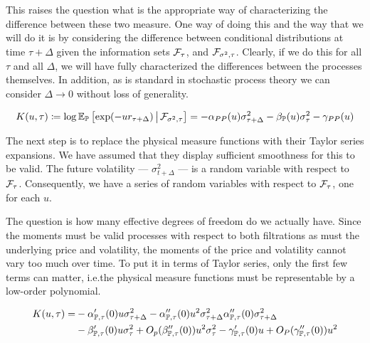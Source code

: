 \documentclass[11pt, letterpaper, twoside, final]{article}
\begin{document}
This raises the question what is the appropriate way of characterizing the difference between these two measure.
One way of doing this and the way that we will do it is by considering the difference between conditional
distributions at time $\tau + \Delta$ given the information sets $\mathcal{F}_{\tau}$, and $\mathcal{F}_{\sigma^2, \tau}$.
Clearly, if we do this for all $\tau$ and all $\Delta$, we will have fully characterized the differences between
the processes themselves.
In addition, as is standard in stochastic process theory we can consider $\Delta \to 0$ without loss of
generality.



\begin{equation}
    K(u, \tau) \coloneqq \log \operatorname{\mathbb{E}}_{\mathbb{P}}\left[\exp(-u r_{\tau + \Delta}) \,\middle\vert\, \mathcal{F}_{\sigma^2, \tau}\right] = -
    \alpha_{PP}(u) \sigma^2_{\tau + \Delta} - \beta_{\mathbb{P}}(u) \sigma^2_{\tau} - \gamma_{PP}(u) 
\end{equation}

The next step is to replace the physical measure functions with their Taylor series expansions.
We have assumed that they display sufficient smoothness for this to be valid.
The future volatility --- $\sigma^2_{t+\Delta}$ --- is a random variable with respect to $\mathcal{F}_{\tau}$.
Consequently, we have a series of random variables with respect to $\mathcal{F}_\tau$, one for each $u$.

The question is how many effective degrees of freedom do we actually have.
Since the moments must be valid processes with respect to both filtrations as must the underlying price and
volatility, the moments of the price and volatility cannot vary too much over time.
To put it in terms of Taylor series, only the first few terms can matter, i.e.\@ the physical measure functions
must be representable by a low-order polynomial.


\begin{equation}
    \label{eqn:cumulant_process_taylor_expansion}
    \begin{alignedat}{2}
        K(u, \tau) &= &&- \alpha_{\mathbb{P}, \tau}'(0) u \sigma^2_{\tau + \Delta} - \alpha_{\mathbb{P}, \tau}''(0) u^2 \sigma^2_{\tau +
            \Delta} \alpha_{\mathbb{P}, \tau}''(0) \sigma^2_{\tau + \Delta}  \\ 
        & &&- \beta_{\mathbb{P}, \tau}'(0) u\sigma^2_{\tau} + O_p(\beta_{\mathbb{P}, \tau}''(0)) u^2 \sigma^2_{\tau} -
          \gamma_{\mathbb{P}, \tau}'(0)u  + O_P(\gamma_{\mathbb{P}, \tau}''(0)) u^2 \\
    \end{alignedat}
\end{equation}
\end{document}
